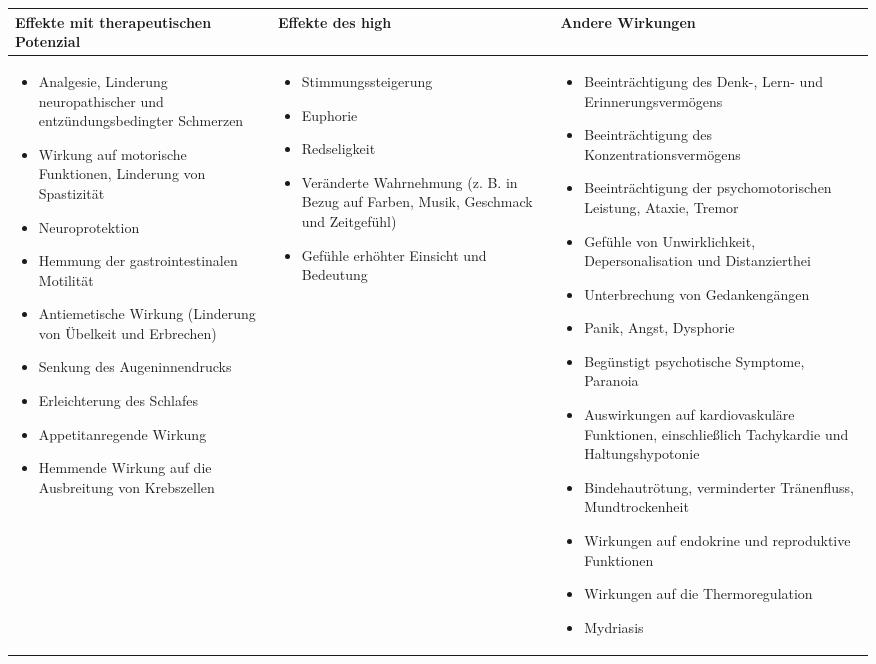 \documentclass[openany]{scrbook}
\begin{document}
	\begin{tabular}{p{5cm}|p{5cm}|p{5cm}}
		\textbf{Effekte mit therapeutischen Potenzial} & \textbf{Effekte des high} & \textbf{Andere Wirkungen} \\ \hline
		\begin{itemize}
			\item Analgesie, Linderung neuropathischer und entzündungsbedingter Schmerzen
			\item Wirkung auf motorische Funktionen, Linderung von Spastizität
			\item Neuroprotektion
			\item Hemmung der gastrointestinalen Motilität
			\item Antiemetische Wirkung (Linderung von Übelkeit und Erbrechen)
			\item Senkung des Augeninnendrucks
			\item Erleichterung des Schlafes
			\item Appetitanregende Wirkung
			\item Hemmende Wirkung auf die Ausbreitung von Krebszellen
		\end{itemize}
		& 
		\begin{itemize}
			\item Stimmungssteigerung
			\item Euphorie
			\item Redseligkeit
			\item Veränderte Wahrnehmung (z. B. in Bezug auf Farben, Musik, Geschmack und Zeitgefühl)
			\item Gefühle erhöhter Einsicht und Bedeutung
		\end{itemize}
		&
		\begin{itemize}
			\item Beeinträchtigung des Denk-, Lern- und Erinnerungsvermögens
			\item Beeinträchtigung des Konzentrationsvermögens
			\item Beeinträchtigung der psychomotorischen Leistung, Ataxie, Tremor
			\item Gefühle von Unwirklichkeit, Depersonalisation und Distanzierthei
			\item Unterbrechung von Gedankengängen
			\item Panik, Angst, Dysphorie
			\item Begünstigt psychotische Symptome, Paranoia
			\item Auswirkungen auf kardiovaskuläre Funktionen, einschließlich Tachykardie und Haltungshypotonie
			\item Bindehautrötung, verminderter Tränenfluss, Mundtrockenheit
			\item Wirkungen auf endokrine und reproduktive Funktionen
			\item Wirkungen auf die Thermoregulation
			\item Mydriasis
		\end{itemize}
	
		
	\end{tabular} \\
	
\end{document}
